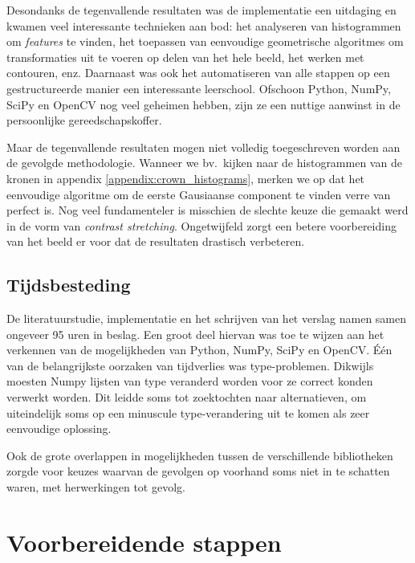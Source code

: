 \documentclass[10pt,a4paper]{article}
\begin{document}
Desondanks de tegenvallende resultaten was de implementatie een uitdaging en kwamen veel interessante technieken aan bod: het analyseren van histogrammen om \emph{features} te vinden, het toepassen van eenvoudige geometrische algoritmes om transformaties uit te voeren op delen van het hele beeld, het werken met contouren, enz. Daarnaast was ook het automatiseren van alle stappen op een gestructureerde manier een interessante leerschool. Ofschoon Python, NumPy, SciPy en OpenCV nog veel geheimen hebben, zijn ze een nuttige aanwinst in de persoonlijke gereedschapskoffer.

Maar de tegenvallende resultaten mogen niet volledig toegeschreven worden aan de gevolgde methodologie. Wanneer we bv.\ kijken naar de histogrammen van de kronen in appendix \ref{appendix:crown_histograms}, merken we op dat het eenvoudige algoritme om de eerste Gausiaanse component te vinden verre van perfect is. Nog veel fundamenteler is misschien de slechte keuze die gemaakt werd in de vorm van \emph{contrast stretching}. Ongetwijfeld zorgt een betere voorbereiding van het beeld er voor dat de resultaten drastisch verbeteren.

\subsection*{Tijdsbesteding}

De literatuurstudie, implementatie en het schrijven van het verslag namen samen ongeveer 95 uren in beslag. Een groot deel hiervan was toe te wijzen aan het verkennen van de mogelijkheden van Python, NumPy, SciPy en OpenCV. \'E\'en van de belangrijkste oorzaken van tijdverlies was type-problemen. Dikwijls moesten Numpy lijsten van type veranderd worden voor ze correct konden verwerkt worden. Dit leidde soms tot zoektochten naar alternatieven, om uiteindelijk soms op een minuscule type-verandering uit te komen als zeer eenvoudige oplossing.

Ook de grote overlappen in mogelijkheden tussen de verschillende bibliotheken zorgde voor keuzes waarvan de gevolgen op voorhand soms niet in te schatten waren, met herwerkingen tot gevolg.





\newpage

\appendix

\section*{Voorbereidende stappen}
\end{document}
